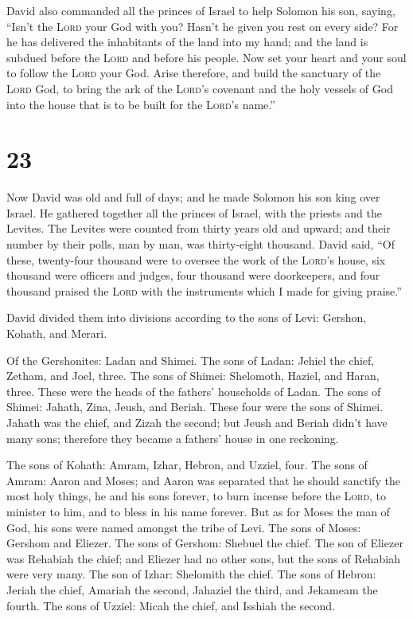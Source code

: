  David also commanded all the princes of Israel to help
Solomon his son, saying,  ``Isn't the \textsc{Lord} your
God with you? Hasn't he given you rest on every side? For he has
delivered the inhabitants of the land into my hand; and the land is
subdued before the \textsc{Lord} and before his people. 
Now set your heart and your soul to follow the \textsc{Lord} your God.
Arise therefore, and build the sanctuary of the \textsc{Lord} God, to
bring the ark of the \textsc{Lord}'s covenant and the holy vessels of
God into the house that is to be built for the \textsc{Lord}'s name.''

\hypertarget{section-22}{%
\section{23}\label{section-22}}

 Now David was old and full of days; and he made Solomon
his son king over Israel.  He gathered together all the
princes of Israel, with the priests and the Levites.  The
Levites were counted from thirty years old and upward; and their number
by their polls, man by man, was thirty-eight thousand. 
David said, ``Of these, twenty-four thousand were to oversee the work of
the \textsc{Lord}'s house, six thousand were officers and judges,
 four thousand were doorkeepers, and four thousand praised
the \textsc{Lord} with the instruments which I made for giving praise.''

 David divided them into divisions according to the sons
of Levi: Gershon, Kohath, and Merari.

 Of the Gershonites: Ladan and Shimei.  The
sons of Ladan: Jehiel the chief, Zetham, and Joel, three. 
The sons of Shimei: Shelomoth, Haziel, and Haran, three. These were the
heads of the fathers' households of Ladan.  The sons of
Shimei: Jahath, Zina, Jeush, and Beriah. These four were the sons of
Shimei.  Jahath was the chief, and Zizah the second; but
Jeush and Beriah didn't have many sons; therefore they became a fathers'
house in one reckoning.

 The sons of Kohath: Amram, Izhar, Hebron, and Uzziel,
four.  The sons of Amram: Aaron and Moses; and Aaron was
separated that he should sanctify the most holy things, he and his sons
forever, to burn incense before the \textsc{Lord}, to minister to him,
and to bless in his name forever.  But as for Moses the
man of God, his sons were named amongst the tribe of Levi.
 The sons of Moses: Gershom and Eliezer. 
The sons of Gershom: Shebuel the chief.  The son of
Eliezer was Rehabiah the chief; and Eliezer had no other sons, but the
sons of Rehabiah were very many.  The son of Izhar:
Shelomith the chief.  The sons of Hebron: Jeriah the
chief, Amariah the second, Jahaziel the third, and Jekameam the fourth.
 The sons of Uzziel: Micah the chief, and Isshiah the
second.

